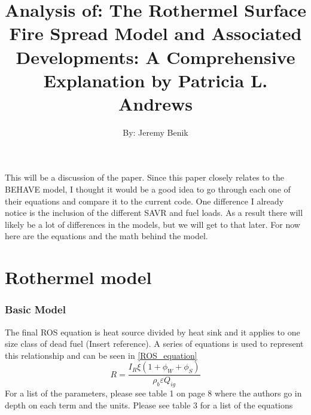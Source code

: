 \documentclass{article}
\begin{document}
\title{Analysis of: The Rothermel Surface Fire Spread Model and Associated Developments: A Comprehensive Explanation by Patricia L. Andrews}
\author{By: Jeremy Benik}
\maketitle



This will be a discussion of the paper. Since this paper closely relates to the BEHAVE model, I thought it would be a good idea to go through each one of their equations and compare it to the current code. One difference I already notice is the inclusion of the different SAVR and fuel loads. As a result there will likely be a lot of differences in the models, but we will get to that later. For now here are the equations and the math behind the model. 

\section{Rothermel model}
\subsubsection*{Basic Model}
	The final ROS equation is heat source divided by heat sink and it applies to one size class of dead fuel (Insert reference). A series of equations is used to represent this relationship and can be seen in \ref{ROS_equation}
	\begin{equation}
		\label{ROS_equation}
		R = \frac{I_R \xi (1 + \phi _W + \phi _ S)} {\rho _b \varepsilon Q_{ig}}
	\end{equation}
For a list of the parameters, please see table 1 on page 8 where the authors go in depth on each term and the units. Please see table 3 for a list of the equations
\end{document}
